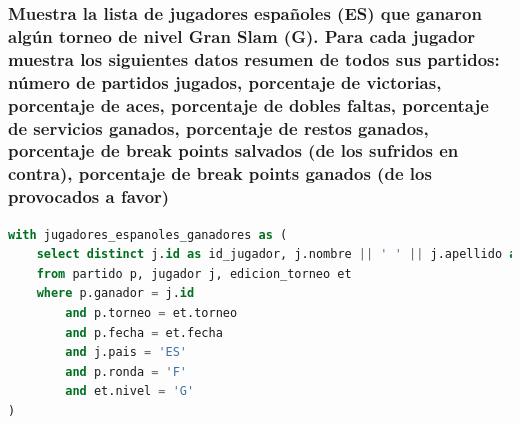 \documentclass[10pt]{opticajnl}
\begin{document}
\subsubsection{Muestra la lista de jugadores españoles (ES) que ganaron algún torneo de nivel Gran Slam (G). Para cada jugador muestra los siguientes datos resumen de todos sus partidos: número de partidos jugados, porcentaje de victorias, porcentaje de aces, porcentaje de dobles faltas, porcentaje de servicios ganados, porcentaje de restos ganados, porcentaje de break points salvados (de los sufridos en contra), porcentaje de break points ganados (de los provocados a favor)}

\begin{lstlisting}[language=SQL]
with jugadores_espanoles_ganadores as (
    select distinct j.id as id_jugador, j.nombre || ' ' || j.apellido as jugador
    from partido p, jugador j, edicion_torneo et 
    where p.ganador = j.id 
        and p.torneo = et.torneo 
        and p.fecha = et.fecha
        and j.pais = 'ES'
        and p.ronda = 'F'
        and et.nivel = 'G'
)


\end{lstlisting}
\end{document}
